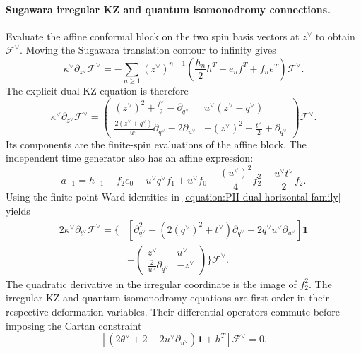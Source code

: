 \documentclass[a4paper,11pt]{article}
\newcommand{\cF}{\mathcal{F}}
\numberwithin{equation}{section}
\begin{document}
\paragraph*{Sugawara irregular KZ and quantum isomonodromy connections.}
Evaluate the affine conformal block on the two spin basis vectors at
$z^{\vee}$ to obtain $\cF^{\vee}$.  Moving the Sugawara translation
contour to infinity gives
\begin{equation}
	\kappa^{\vee}\partial_{z^{\vee}}\cF^{\vee}
	=-\sum_{n\geq1}(z^{\vee})^{n-1}
	\left(\frac{h_{n}}{2}h^{T}+e_{n}f^{T}+f_{n}e^{T}\right)\cF^{\vee}.
\end{equation}
The explicit dual KZ equation is therefore
\begin{equation}
	\label{equation:PII dual affine KZ}
	\kappa^{\vee}\partial_{z^{\vee}}\cF^{\vee}
	=
	\begin{pmatrix}
		(z^{\vee})^{2}+\frac{t^{\vee}}{2}-\partial_{q^{\vee}}
		&u^{\vee}(z^{\vee}-q^{\vee})\\[2mm]
		\frac{2(z^{\vee}+q^{\vee})}{u^{\vee}}\partial_{q^{\vee}}
		-2\partial_{u^{\vee}}
		&-(z^{\vee})^{2}-\frac{t^{\vee}}{2}+\partial_{q^{\vee}}
	\end{pmatrix}\cF^{\vee}.
\end{equation}
Its components are the finite-spin evaluations of the affine block.
The independent time generator also has an affine expression:
\begin{equation}
	a_{-1}=h_{-1}-f_{2}e_{0}-u^{\vee}q^{\vee}f_{1}
	+u^{\vee}f_{0}
	-\frac{(u^{\vee})^{2}}{4}f_{2}^{2}
	-\frac{u^{\vee}t^{\vee}}{2}f_{2}.
\end{equation}
Using the finite-point Ward identities in
\eqref{equation:PII dual horizontal family} yields
\begin{equation}
	\label{equation:PII dual affine time}
	\begin{aligned}
		2\kappa^{\vee}\partial_{t^{\vee}}\cF^{\vee}
		=\Bigg\{&
		\left[\partial_{q^{\vee}}^{2}
		-(2(q^{\vee})^{2}+t^{\vee})\partial_{q^{\vee}}
		+2q^{\vee}u^{\vee}\partial_{u^{\vee}}\right]\mathbf{1}\\
		&+\begin{pmatrix}
			z^{\vee}&u^{\vee}\\[1mm]
			\frac{2}{u^{\vee}}\partial_{q^{\vee}}&-z^{\vee}
		\end{pmatrix}\Bigg\}\cF^{\vee}.
	\end{aligned}
\end{equation}
The quadratic derivative in the irregular coordinate is the image
of $f_{2}^{2}$.  The irregular KZ and quantum isomonodromy equations are first order in
their respective deformation variables.  Their differential
operators commute before imposing the Cartan constraint
\begin{equation}
	\left[(2\theta^{\vee}+2-2u^{\vee}\partial_{u^{\vee}})\mathbf{1}
	+h^{T}\right]\cF^{\vee}=0.
\end{equation}
\end{document}
